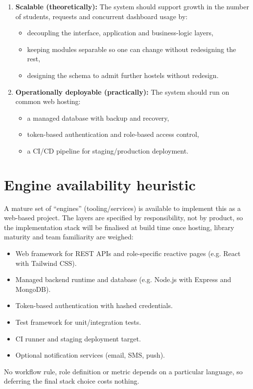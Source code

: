 \documentclass[11pt,a4paper]{article}
\begin{document}
\begin{enumerate}[leftmargin=0.7cm]
    \item \textbf{Scalable (theoretically):} The system should support growth in the number of
    students, requests and concurrent dashboard usage by:
    \begin{itemize}[leftmargin=0.7cm]
        \item decoupling the interface, application and business-logic layers,
        \item keeping modules separable so one can change without redesigning the rest,
        \item designing the schema to admit further hostels without redesign.
    \end{itemize}

    \item \textbf{Operationally deployable (practically):} The system should run on common web
    hosting:
    \begin{itemize}[leftmargin=0.7cm]
        \item a managed database with backup and recovery,
        \item token-based authentication and role-based access control,
        \item a CI/CD pipeline for staging/production deployment.
    \end{itemize}
\end{enumerate}

\section{Engine availability heuristic}
A mature set of ``engines'' (tooling/services) is available to implement this as a web-based
project. The layers are specified by responsibility, not by product, so the implementation
stack will be finalised at build time once hosting, library maturity and team familiarity are
weighed:
\begin{itemize}[leftmargin=0.7cm]
    \item Web framework for REST APIs and role-specific reactive pages (e.g. React with
    Tailwind CSS).
    \item Managed backend runtime and database (e.g. Node.js with Express and MongoDB).
    \item Token-based authentication with hashed credentials.
    \item Test framework for unit/integration tests.
    \item CI runner and staging deployment target.
    \item Optional notification services (email, SMS, push).
\end{itemize}
No workflow rule, role definition or metric depends on a particular language, so deferring the
final stack choice costs nothing.
\end{document}
